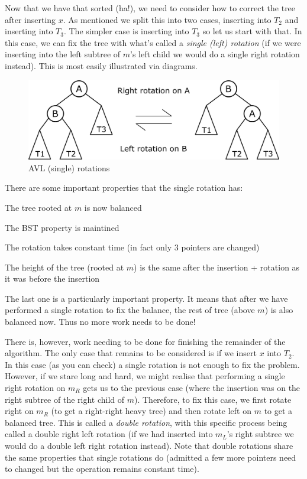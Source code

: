 Now that we have that sorted (ha!), we need to consider how to correct the tree after inserting $x$. As mentioned we split this into two cases, inserting into $T_2$ and inserting into $T_3$. The simpler case is inserting into $T_3$ so let us start with that. In this case, we can fix the tree with what's called a \textit{single (left) rotation} (if we were inserting into the left subtree of $m$'s left child we would do a single right rotation instead). This is most easily illustrated via diagrams. 

\begin{figure}[h]
    \centering
    \includegraphics[scale=0.6]{Images/avl_single_rotations.png}
    \caption{AVL (single) rotations}
    \label{fig:avl-sing-rotation}
\end{figure}

There are some important properties that the single rotation has:
\begin{minitemize}
    \item The tree rooted at $m$ is now balanced
    \item The BST property is maintined
    \item The rotation takes constant time (in fact only 3 pointers are changed)
    \item The height of the tree (rooted at $m$) is the same after the insertion + rotation as it was before the insertion
\end{minitemize}
The last one is a particularly important property. It means that after we have performed a single rotation to fix the balance, the rest of tree (above $m$) is also balanced now. Thus no more work needs to be done!

There is, however, work needing to be done for finishing the remainder of the algorithm. The only case that remains to be considered is if we insert $x$ into $T_2$. In this case (as you can check) a single rotation is not enough to fix the problem. However, if we stare long and hard, we might realise that performing a single right rotation on $m_R$ gets us to the previous case (where the insertion was on the right subtree of the right child of $m$). Therefore, to fix this case, we first rotate right on $m_R$ (to get a right-right heavy tree) and then rotate left on $m$ to get a balanced tree. This is called a \textit{double rotation}, with this specific process being called a double right left rotation (if we had inserted into $m_L$'s right subtree we would do a double left right rotation instead). Note that double rotations share the same properties that single rotations do (admitted a few more pointers need to changed but the operation remains constant time).

